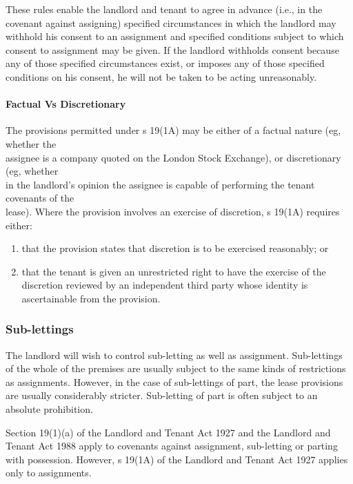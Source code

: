 \documentclass[
]{article}
\providecommand{\tightlist}{%
  \setlength{\itemsep}{0pt}\setlength{\parskip}{0pt}}
\begin{document}
These rules enable the landlord and tenant to agree in advance (i.e., in
the covenant against assigning) specified circumstances in which the
landlord may withhold his consent to an assignment and specified
conditions subject to which consent to assignment may be given. If the
landlord withholds consent because any of those specified circumstances
exist, or imposes any of those specified conditions on his consent, he
will not be taken to be acting unreasonably.

\hypertarget{factual-vs-discretionary}{%
\paragraph{Factual Vs Discretionary}\label{factual-vs-discretionary}}

The provisions permitted under s 19(1A) may be either of a factual
nature (eg, whether the\\
assignee is a company quoted on the London Stock Exchange), or
discretionary (eg, whether\\
in the landlord's opinion the assignee is capable of performing the
tenant covenants of the\\
lease). Where the provision involves an exercise of discretion, s 19(1A)
requires either:

\begin{enumerate}
\def\labelenumi{\arabic{enumi}.}
\tightlist
\item
  that the provision states that discretion is to be exercised
  reasonably; or
\item
  that the tenant is given an unrestricted right to have the exercise of
  the discretion reviewed by an independent third party whose identity
  is ascertainable from the provision.
\end{enumerate}

\hypertarget{sub-lettings}{%
\subsubsection{Sub-lettings}\label{sub-lettings}}

The landlord will wish to control sub-letting as well as assignment.
Sub-lettings of the whole of the premises are usually subject to the
same kinds of restrictions as assignments. However, in the case of
sub-lettings of part, the lease provisions are usually considerably
stricter. Sub-letting of part is often subject to an absolute
prohibition.

Section 19(1)(a) of the Landlord and Tenant Act 1927 and the Landlord
and Tenant Act 1988 apply to covenants against assignment, sub-letting
or parting with possession. However, s 19(1A) of the Landlord and Tenant
Act 1927 applies only to assignments.
\end{document}
